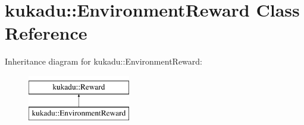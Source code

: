 \hypertarget{classkukadu_1_1EnvironmentReward}{\section{kukadu\-:\-:Environment\-Reward Class Reference}
\label{classkukadu_1_1EnvironmentReward}
}
Inheritance diagram for kukadu\-:\-:Environment\-Reward\-:\begin{figure}[H]
\begin{center}
\leavevmode
\includegraphics[height=2.000000cm]{classkukadu_1_1EnvironmentReward}
\end{center}
\end{figure}
